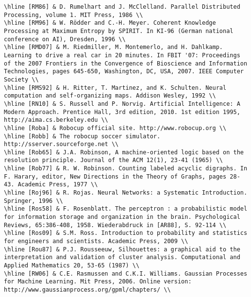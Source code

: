 \documentclass[10pt]{article}
\begin{document}
\begin{verbatim}
\hline [RM86] & D. Rumelhart and J. McClelland. Parallel Distributed Processing, volume 1. MIT Press, 1986 \\
\hline [RM96] & W. Rödder and C.-H. Meyer. Coherent Knowledge Processing at Maximum Entropy by SPIRIT. In KI-96 (German national conference on AI), Dresden, 1996 \\
\hline [RMD07] & M. Riedmiller, M. Montemerlo, and H. Dahlkamp. Learning to drive a real car in 20 minutes. In FBIT '07: Proceedings of the 2007 Frontiers in the Convergence of Bioscience and Information Technologies, pages 645-650, Washington, DC, USA, 2007. IEEE Computer Society \\
\hline [RMS92] & H. Ritter, T. Martinez, and K. Schulten. Neural computation and self-organizing maps. Addison Wesley, 1992 \\
\hline [RN10] & S. Russell and P. Norvig. Artificial Intelligence: A Modern Approach. Prentice Hall, 3rd edition, 2010. 1st edition 1995, http://aima.cs.berkeley.edu \\
\hline [Roba] & Robocup official site. http://www.robocup.org \\
\hline [Robb] & The robocup soccer simulator. http://sserver.sourceforge.net \\
\hline [Rob65] & J.A. Robinson, A machine-oriented logic based on the resolution principle. Journal of the ACM 12(1), 23-41 (1965) \\
\hline [Rob77] & R. W. Robinson. Counting labeled acyclic digraphs. In F. Harary, editor, New Directions in the Theory of Graphs, pages 28-43. Academic Press, 1977 \\
\hline [Roj96] & R. Rojas. Neural Networks: a Systematic Introduction. Springer, 1996 \\
\hline [Ros58] & F. Rosenblatt. The perceptron : a probabilistic model for information storage and organization in the brain. Psychological Reviews, 65:386-408, 1958. Wiederabdruck in [AR88], S. 92-114 \\
\hline [Ros09] & S.M. Ross. Introduction to probability and statistics for engineers and scientists. Academic Press, 2009 \\
\hline [Rou87] & P.J. Rousseeuw, Silhouettes: a graphical aid to the interpretation and validation of cluster analysis. Computational and Applied Mathematics 20, 53-65 (1987) \\
\hline [RW06] & C.E. Rasmussen and C.K.I. Williams. Gaussian Processes for Machine Learning. Mit Press, 2006. Online version: http://www.gaussianprocess.org/gpml/chapters/ \\

\end{verbatim}
\end{document}
